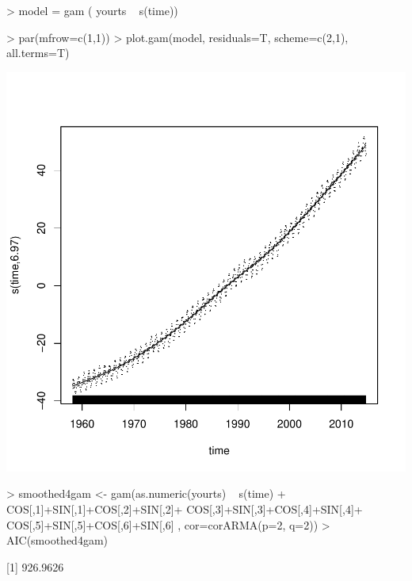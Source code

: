 \documentclass[10pt, a4paper]{article} %
\begin{document}
\begin{Schunk}
\begin{Sinput}
> model = gam ( yourts ~ s(time))
\end{Sinput}
\end{Schunk}

\begin{Schunk}
\begin{Sinput}
> par(mfrow=c(1,1))
> plot.gam(model, residuals=T, scheme=c(2,1), all.terms=T)
\end{Sinput}
\end{Schunk}
\includegraphics{FINAL_VERSION-078}

\begin{Schunk}
\begin{Sinput}
> smoothed4gam <- gam(as.numeric(yourts) ~ s(time)  +
                         COS[,1]+SIN[,1]+COS[,2]+SIN[,2]+
                         COS[,3]+SIN[,3]+COS[,4]+SIN[,4]+
                         COS[,5]+SIN[,5]+COS[,6]+SIN[,6]
                       , cor=corARMA(p=2, q=2))
> AIC(smoothed4gam)
\end{Sinput}
[1] 926.9626\end{Schunk}
\end{document}
